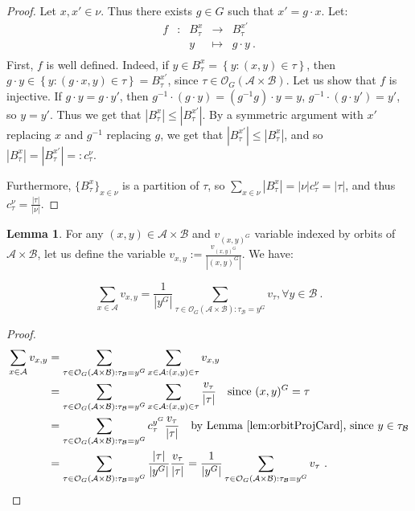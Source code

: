 \documentclass[11pt]{article}
\theoremstyle{definition}
\newtheorem{lem}[theo]{Lemma}
\theoremstyle{remark}
\begin{document}
\begin{proof}
  Let $x,x' \in \nu$. Thus there exists $g \in G$ such that $x' = g \cdot x$. Let:
  \[ \begin{array}{ccccc}
    f & : & B_{\tau}^x  & \to & B_{\tau}^{x'} \\
    & & y & \mapsto & g \cdot y \ .\\
  \end{array}\]
  First, $f$ is well defined. Indeed, if $y \in B_{\tau}^x = \left\{y:(x,y)\in\tau\right\}$, then $g \cdot y \in \left\{y:(g \cdot x,y)\in\tau\right\} = B_{\tau}^{x'}$, since $\tau \in \mathcal{O}_G(\mathcal{A} \times \mathcal{B})$. Let us show that $f$ is injective. If $g \cdot y = g \cdot y'$, then $g^{-1} \cdot (g \cdot y) = (g^{-1}g) \cdot y = y$, $g^{-1} \cdot (g \cdot y') = y'$, so $y=y'$. Thus we get that $|B_{\tau}^x|\leq|B_{\tau}^{x'}|$. By a symmetric argument with $x'$ replacing $x$ and $g^{-1}$ replacing $g$, we get that $|B_{\tau}^{x'}|\leq|B_{\tau}^x|$, and so $|B_{\tau}^x|=|B_{\tau}^{x'}|=:c_{\tau}^{\nu}$.

  Furthermore, $\{ B_{\tau}^x \}_{x \in \nu}$ is a partition of $\tau$, so $\sum_{x \in \nu} |B_{\tau}^x| = |\nu| c_{\tau}^{\nu} = |\tau|$, and thus $c_{\tau}^{\nu}=\frac{|\tau|}{|\nu|}$.
\end{proof}

\begin{lem}
  \label{lem:fromOrbitToEle} For any $(x,y) \in \mathcal{A} \times \mathcal{B}$ and $v_{(x,y)^G}$ variable indexed by orbits of $\mathcal{A} \times \mathcal{B}$, let us define the variable $v_{x,y} := \frac{v_{(x,y)^G}}{|(x,y)^G|}$. We have:

  \[ \sum_{x \in \mathcal{A}} v_{x,y} = \frac{1}{|y^G|}\sum_{\tau \in \mathcal{O}_G(\mathcal{A} \times \mathcal{B}): \tau_{\mathcal{B}}=y^G} v_{\tau}, \forall y \in \mathcal{B} \ .\]
\end{lem}

\begin{proof}
  \begin{equation}
    \begin{aligned}
      \sum_{x \in \mathcal{A}} v_{x,y} &= \sum_{\tau \in \mathcal{O}_G(\mathcal{A} \times \mathcal{B}):\tau_{\mathcal{B}}=y^G}\sum_{x \in \mathcal{A}:(x,y) \in \tau} v_{x,y}\\
      &= \sum_{\tau \in \mathcal{O}_G(\mathcal{A} \times \mathcal{B}):\tau_{\mathcal{B}}=y^G}\sum_{x \in \mathcal{A}:(x,y) \in \tau} \frac{v_{\tau}}{|\tau|} \quad \text{since } (x,y)^G=\tau\\
      &= \sum_{\tau \in \mathcal{O}_G(\mathcal{A} \times \mathcal{B}):\tau_{\mathcal{B}}=y^G} c^{y^G}_{\tau} \frac{v_{\tau}}{|\tau|} \quad \text{by Lemma~\ref{lem:orbitProjCard}, since } y \in \tau_{\mathcal{B}}\\
      &= \sum_{\tau \in \mathcal{O}_G(\mathcal{A} \times \mathcal{B}):\tau_{\mathcal{B}}=y^G} \frac{|\tau|}{|y^G|} \frac{v_{\tau}}{|\tau|} = \frac{1}{|y^G|}\sum_{\tau \in \mathcal{O}_G(\mathcal{A} \times \mathcal{B}): \tau_{\mathcal{B}}=y^G} v_{\tau} \ .
    \end{aligned}
  \end{equation}
\end{proof}
\end{document}
